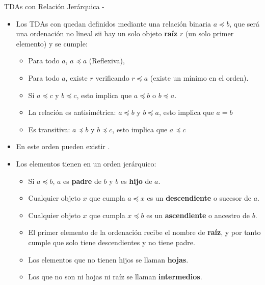 \documentclass[10pt,envcountsect,spanish]{beamer}
\begin{document}
\begin{frame}[allowframebreaks]{TDAs con Relación Jerárquica - }

\begin{itemize}
\item Los TDAs con  quedan definidos mediante una relación binaria $a\preceq b$, que será una ordenación no lineal sii hay un solo objeto \textbf{raíz} $r$ (un solo primer elemento) y se cumple:
\begin{itemize}
\item Para todo $a$, $a\preceq a$ (Reflexiva),
\item Para todo $a$, existe $r$ verificando $r\preceq a$ (existe un mínimo en el orden).
\item Si $a\preceq c$ y $b\preceq c$, esto implica que $a\preceq b$ o $b\preceq a$.
\item La relación es antisimétrica:  $a\preceq b$ y $b\preceq a$, esto implica que $a=b$
\item Es transitiva:  $a\preceq b$ y $b\preceq c$, esto implica que $a\preceq c$
\end{itemize}

\item En este orden  pueden existir . 


\item Los elementos tienen  en un orden jerárquico:
\begin{itemize}
\item Si $a\preceq b$, $a$ es \textbf{padre} de $b$ y $b$ es \textbf{hijo} de $a$.
\item Cualquier objeto $x$ que cumpla $a\preceq x$ es un \textbf{descendiente} o sucesor de $a$.
\item Cualquier objeto $x$ que cumpla $x\preceq b$ es un \textbf{ascendiente} o ancestro de $b$.
\item El primer elemento de la ordenación recibe el nombre de \textbf{raíz}, y por tanto cumple que solo tiene descendientes y no tiene padre.
\item Los elementos que no tienen hijos se llaman \textbf{hojas}.
\item Los que no son ni hojas ni raíz se llaman \textbf{intermedios}.
\end{itemize}


\framebreak



\end{itemize}
\end{frame}
\end{document}
